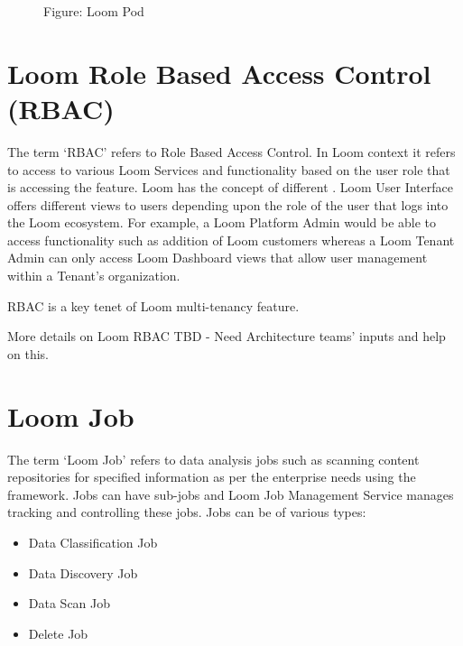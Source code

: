 \documentclass[letterpaper,10pt,english]{sphinxmanual}
\begin{document}
\begin{figure}[htbp]
\centering
\capstart

\noindent{}
\caption{Figure: Loom Pod}\label{\detokenize{mcdmp_concepts:id21}}\end{figure}


\section{Loom Role Based Access Control (RBAC)}
\label{\detokenize{mcdmp_concepts:loom-role-based-access-control-rbac}}
The term ‘RBAC’ refers to Role Based Access Control. In Loom context it refers to access to various Loom Services and functionality based on the user role that is accessing the feature.  Loom has the concept of different {\hyperref[\detokenize{mcdmp_concepts:content-loom-roles}]{}}. Loom User Interface offers different views to users depending upon the role of the user that logs into the Loom ecosystem.  For example, a Loom Platform Admin would be able to access functionality such as addition of Loom customers whereas a Loom Tenant Admin can only access Loom Dashboard views that allow user management within a Tenant’s organization.

RBAC is a key tenet of Loom multi-tenancy feature.

More details on Loom RBAC TBD - Need Architecture teams’ inputs and help on this.


\section{Loom Job}
\label{\detokenize{mcdmp_concepts:loom-job}}\label{\detokenize{mcdmp_concepts:term-loom-job}}
The term ‘Loom Job’ refers to data analysis jobs such as scanning content repositories for specified information as per the enterprise needs using the {\hyperref[\detokenize{mcdmp_concepts:term-loom-policy}]{}} framework. Jobs can have sub-jobs and Loom Job Management Service manages tracking and controlling these jobs.  Jobs can be of various types:
\begin{itemize}
\item {} 
Data Classification Job

\item {} 
Data Discovery Job

\item {} 
Data Scan Job

\item {} 
Delete Job

\end{itemize}
\end{document}
